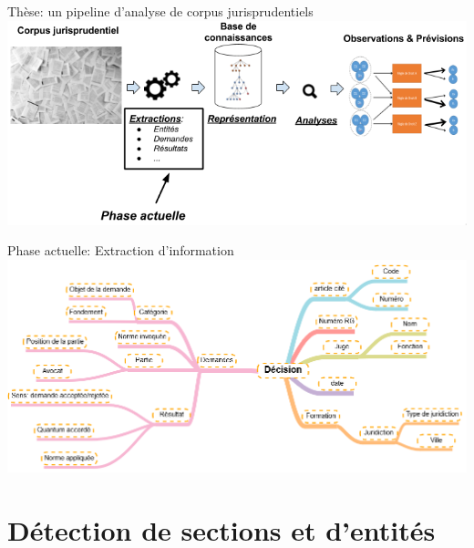 \documentclass[newPxFont,pagenumber]{beamer}
\begin{document}
\begin{frame}{Thèse: un pipeline d'analyse de corpus jurisprudentiels}
\includegraphics[width=\textwidth]{pipeline-cassandra2.png}
\end{frame}


\begin{frame}{Phase actuelle: Extraction d'information}
\includegraphics[width=0.9\paperwidth]{arbre-des-infos.PNG}
\end{frame}

\section{Détection de sections et d'entités}
\end{document}
